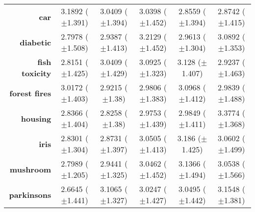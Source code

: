 \begin{table}[htb]
{\begin{tabular}{r|ccccc}
			\textbf{car}                 & \cellcolor[rgb]{ .973,  .412,  .42}3.1892 ($\pm$1.391)  & \cellcolor[rgb]{ 1,  .922,  .518}3.0409 ($\pm$1.394)    & \cellcolor[rgb]{ 1,  .922,  .518}3.0398 ($\pm$1.452)    & \cellcolor[rgb]{ .388,  .745,  .482}2.8559 ($\pm$1.394) & \cellcolor[rgb]{ .447,  .761,  .482}2.8742 ($\pm$1.415) \\
			\textbf{diabetic}            & \cellcolor[rgb]{ .388,  .745,  .482}2.7978 ($\pm$1.508) & \cellcolor[rgb]{ .914,  .894,  .51}2.9387 ($\pm$1.413)  & \cellcolor[rgb]{ .973,  .412,  .42}3.2129 ($\pm$1.452)  & \cellcolor[rgb]{ 1,  .922,  .518}2.9613 ($\pm$1.304)    & \cellcolor[rgb]{ .988,  .663,  .471}3.0892 ($\pm$1.353) \\
			\textbf{fish toxicity}       & \cellcolor[rgb]{ .388,  .745,  .482}2.8151 ($\pm$1.425) & \cellcolor[rgb]{ 1,  .922,  .518}3.0409 ($\pm$1.429)    & \cellcolor[rgb]{ .984,  .62,  .463}3.0925 ($\pm$1.323)  & \cellcolor[rgb]{ .973,  .412,  .42}3.128 ($\pm$1.407)   & \cellcolor[rgb]{ .682,  .827,  .498}2.9237 ($\pm$1.463) \\
			\textbf{forest fires}        & \cellcolor[rgb]{ .992,  .773,  .49}3.0172 ($\pm$1.403)  & \cellcolor[rgb]{ .388,  .745,  .482}2.9215 ($\pm$1.38)  & \cellcolor[rgb]{ .965,  .91,  .514}2.9806 ($\pm$1.383)  & \cellcolor[rgb]{ .973,  .412,  .42}3.0968 ($\pm$1.412)  & \cellcolor[rgb]{ 1,  .922,  .518}2.9839 ($\pm$1.488)    \\
			\textbf{housing}             & \cellcolor[rgb]{ .431,  .757,  .482}2.8366 ($\pm$1.404) & \cellcolor[rgb]{ .388,  .745,  .482}2.8258 ($\pm$1.38)  & \cellcolor[rgb]{ 1,  .922,  .518}2.9753 ($\pm$1.439)    & \cellcolor[rgb]{ 1,  .91,  .518}2.9849 ($\pm$1.411)     & \cellcolor[rgb]{ .973,  .412,  .42}3.3774 ($\pm$1.368)  \\
			\textbf{iris}                & \cellcolor[rgb]{ .388,  .745,  .482}2.8301 ($\pm$1.304) & \cellcolor[rgb]{ .506,  .776,  .486}2.8731 ($\pm$1.397) & \cellcolor[rgb]{ 1,  .922,  .518}3.0505 ($\pm$1.413)    & \cellcolor[rgb]{ .973,  .412,  .42}3.186 ($\pm$1.425)   & \cellcolor[rgb]{ 1,  .886,  .514}3.0602 ($\pm$1.499)    \\
			\textbf{mushroom}            & \cellcolor[rgb]{ .388,  .745,  .482}2.7989 ($\pm$1.205) & \cellcolor[rgb]{ .745,  .847,  .502}2.9441 ($\pm$1.325) & \cellcolor[rgb]{ 1,  .922,  .518}3.0462 ($\pm$1.452)    & \cellcolor[rgb]{ .973,  .412,  .42}3.1366 ($\pm$1.494)  & \cellcolor[rgb]{ 1,  .882,  .51}3.0538 ($\pm$1.566)     \\
			\textbf{parkinsons}          & \cellcolor[rgb]{ .388,  .745,  .482}2.6645 ($\pm$1.441) & \cellcolor[rgb]{ .988,  .647,  .467}3.1065 ($\pm$1.327) & \cellcolor[rgb]{ .957,  .91,  .514}3.0247 ($\pm$1.427)  & \cellcolor[rgb]{ 1,  .922,  .518}3.0495 ($\pm$1.442)    & \cellcolor[rgb]{ .973,  .412,  .42}3.1548 ($\pm$1.381)  \\

\end{tabular}}
\end{table}
